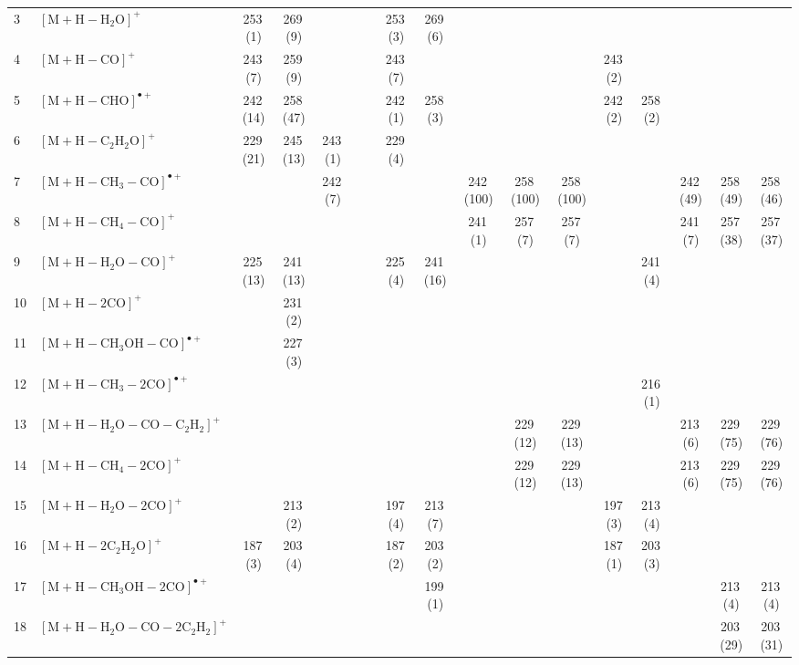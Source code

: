 \documentclass[]{article}
\begin{document}
\begin{table}
{\begin{tabular}{ll|ccccc|ccccc|ccccc}
  3 & $\mathrm{[M{+}H{-}H_{2}O]^+}$ & 253\,(1) & 269\,(9) &  &  &  & 253\,(3) & 269\,(6) &  &  &  &  &  &  &  &  \\ 
  4 & $\mathrm{[M{+}H{-}CO]^+}$ & 243\,(7) & 259\,(9) &  &  &  & 243\,(7) &  &  &  &  & 243\,(2) &  &  &  &  \\ 
  5 & $\mathrm{[M{+}H{-}CHO]^{\bullet+}}$ & 242\,(14) & 258\,(47) &  &  &  & 242\,(1) & 258\,(3) &  &  &  & 242\,(2) & 258\,(2) &  &  &  \\ 
  6 & $\mathrm{[M{+}H{-}C_{2}H_{2}O]^+}$ & 229\,(21) & 245\,(13) & 243\,(1) &  &  & 229\,(4) &  &  &  &  &  &  &  &  &  \\ 
  7 & $\mathrm{[M{+}H{-}CH_{3}{-}CO]^{\bullet+}}$ &  &  & 242\,(7) &  &  &  &  & 242\,(100) & 258\,(100) & 258\,(100) &  &  & 242\,(49) & 258\,(49) & 258\,(46) \\ 
  8 & $\mathrm{[M{+}H{-}CH_{4}{-}CO]^+}$ &  &  &  &  &  &  &  & 241\,(1) & 257\,(7) & 257\,(7) &  &  & 241\,(7) & 257\,(38) & 257\,(37) \\ 
  9 & $\mathrm{[M{+}H{-}H_{2}O{-}CO]^+}$ & 225\,(13) & 241\,(13) &  &  &  & 225\,(4) & 241\,(16) &  &  &  &  & 241\,(4) &  &  &  \\ 
  10 & $\mathrm{[M{+}H{-}2CO]^+}$ &  & 231\,(2) &  &  &  &  &  &  &  &  &  &  &  &  &  \\ 
  11 & $\mathrm{[M{+}H{-}CH_{3}OH{-}CO]^{\bullet+}}$ &  & 227\,(3) &  &  &  &  &  &  &  &  &  &  &  &  &  \\ 
  12 & $\mathrm{[M{+}H{-}CH_{3}{-}2CO]^{\bullet+}}$ &  &  &  &  &  &  &  &  &  &  &  & 216\,(1) &  &  &  \\ 
  13 & $\mathrm{[M{+}H{-}H_{2}O{-}CO{-}C_{2}H_{2}]^+}$ &  &  &  &  &  &  &  &  & 229\,(12) & 229\,(13) &  &  & 213\,(6) & 229\,(75) & 229\,(76) \\ 
  14 & $\mathrm{[M{+}H{-}CH_{4}{-}2CO]^+}$ &  &  &  &  &  &  &  &  & 229\,(12) & 229\,(13) &  &  & 213\,(6) & 229\,(75) & 229\,(76) \\ 
  15 & $\mathrm{[M{+}H{-}H_{2}O{-}2CO]^+}$ &  & 213\,(2) &  &  &  & 197\,(4) & 213\,(7) &  &  &  & 197\,(3) & 213\,(4) &  &  &  \\ 
  16 & $\mathrm{[M{+}H{-}2C_{2}H_{2}O]^+}$ & 187\,(3) & 203\,(4) &  &  &  & 187\,(2) & 203\,(2) &  &  &  & 187\,(1) & 203\,(3) &  &  &  \\ 
  17 & $\mathrm{[M{+}H{-}CH_{3}OH{-}2CO]^{\bullet+}}$ &  &  &  &  &  &  & 199\,(1) &  &  &  &  &  &  & 213\,(4) & 213\,(4) \\ 
  18 & $\mathrm{[M{+}H{-}H_{2}O{-}CO{-}2C_{2}H_{2}]^+}$ &  &  &  &  &  &  &  &  &  &  &  &  &  & 203\,(29) & 203\,(31) \\ 

\end{tabular}}
\end{table}
\end{document}
